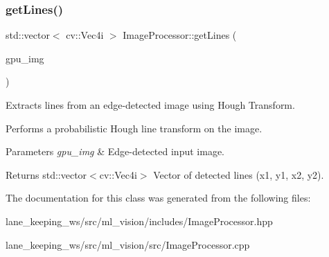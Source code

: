 \subsubsection{\texorpdfstring{get\+Lines()}{getLines()}}
{\footnotesize\ttfamily std\+::vector$<$ cv\+::\+Vec4i $>$ Image\+Processor\+::get\+Lines (\begin{DoxyParamCaption}\item[{cv\+::cuda\+::\+Gpu\+Mat \&}]{gpu\+\_\+img }\end{DoxyParamCaption})}



Extracts lines from an edge-\/detected image using Hough Transform. 

Performs a probabilistic Hough line transform on the image.


\begin{DoxyParams}{Parameters}
{\em gpu\+\_\+img} & Edge-\/detected input image. \\
\hline
\end{DoxyParams}
\begin{DoxyReturn}{Returns}
std\+::vector$<$cv\+::\+Vec4i$>$ Vector of detected lines (x1, y1, x2, y2). 
\end{DoxyReturn}


The documentation for this class was generated from the following files\+:\begin{DoxyCompactItemize}
\item 
lane\+\_\+keeping\+\_\+ws/src/ml\+\_\+vision/includes/Image\+Processor.\+hpp\item 
lane\+\_\+keeping\+\_\+ws/src/ml\+\_\+vision/src/Image\+Processor.\+cpp\end{DoxyCompactItemize}
